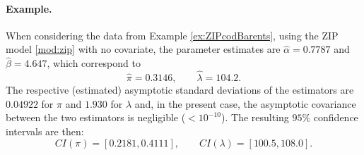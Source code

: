 \paragraph{Example.}
When considering the data from Example \ref{ex:ZIPcodBarents}, using the ZIP model \eqref{mod:zip} with no covariate, the parameter estimates are $\widehat{\alpha} = 0.7787$ and $\widehat{\beta} = 4.647$, which correspond to
$$
\widehat{\pi} = 0.3146, \qquad \widehat{\lambda} = 104.2.
$$
The respective (estimated) asymptotic standard deviations of the estimators are $0.04922$ for $\widehat{\pi}$ and $1.930$ for $\widehat{\lambda}$ and, in the present case, the asymptotic covariance between the two estimators is negligible ($< 10^{-10}$). The resulting $95\%$ confidence intervals are then:
$$
CI(\pi) = [0.2181, 0.4111], \qquad
CI(\lambda) = [100.5, 108.0].
$$


\FloatBarrier


